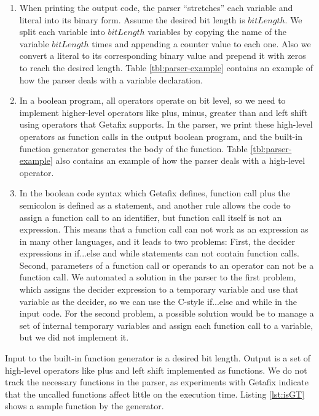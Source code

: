 \begin{enumerate}
\item When printing the output code, the parser ``stretches'' each variable and literal into its binary form. Assume the desired bit length is $bitLength$. We split each variable into $bitLength$ variables by copying the name of the variable $bitLength$ times and appending a counter value to each one. Also we convert a literal to its corresponding binary value and prepend it with zeros to reach the desired length. Table \ref{tbl:parser-example} contains an example of how the parser deals with a variable declaration.
\item In a boolean program, all operators operate on bit level, so we need to implement higher-level operators like plus, minus, greater than and left shift using operators that Getafix supports. In the parser, we print these high-level operators as function calls in the output boolean program, and the built-in function generator generates the body of the function. Table \ref{tbl:parser-example} also contains an example of how the parser deals with a high-level operator.
\item In the boolean code syntax which Getafix defines, function call plus the semicolon is defined as a statement, and another rule allows the code to assign a function call to an identifier, but function call itself is not an expression. This means that a function call can not work as an expression as in many other languages, and it leads to two problems: First, the decider expressions in if...else and while statements can not contain function calls. Second, parameters of a function call or operands to an operator can not be a function call. We automated a solution in the parser to the first problem, which assigns the decider expression to a temporary variable and use that variable as the decider, so we can use the C-style if...else and while in the input code. For the second problem, a possible solution would be to manage a set of internal temporary variables and assign each function call to a variable, but we did not implement it.
\end{enumerate}

Input to the built-in function generator is a desired bit length. Output is a set of high-level operators like plus and left shift implemented as functions. We do not track the necessary functions in the parser, as experiments with Getafix indicate that the uncalled functions affect little on the execution time. Listing \ref{lst:isGT} shows a sample function by the generator.


